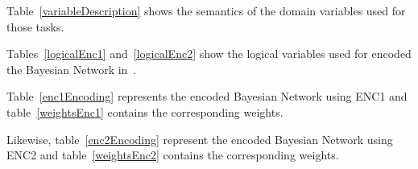 Table~\ref{variableDescription} shows the semantics of the domain variables used for those tasks.

\par
Tables~\ref{logicalEnc1} and~\ref{logicalEnc2} show the logical variables used for encoded the Bayesian Network in~\cite{bayesian_network}.


\par
Table~\ref{enc1Encoding} represents the encoded Bayesian Network using ENC1 and table~\ref{weightsEnc1} contains the corresponding weights.
%


\par
Likewise, table~\ref{enc2Encoding} represent the encoded Bayesian Network using ENC2 and table~\ref{weightsEnc2} contains the corresponding weights.
%



